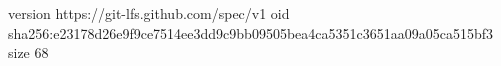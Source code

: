 version https://git-lfs.github.com/spec/v1
oid sha256:e23178d26e9f9ce7514ee3dd9c9bb09505bea4ca5351c3651aa09a05ca515bf3
size 68
